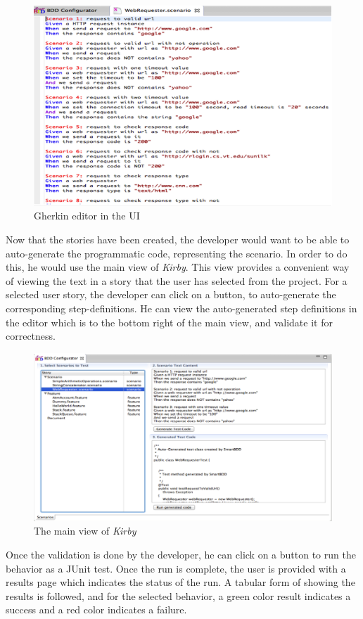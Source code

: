 \documentclass[conference, onecolumn, a4, 12pt]{IEEEtran}
\begin{document}
\begin{figure}
	\centering
	\includegraphics[width=0.7\linewidth]{Gherkin_editor}
	\caption{Gherkin editor in the UI}
	\label{fig:gherkineditor}
\end{figure}

Now that the stories have been created, the developer would want to be able to auto-generate the programmatic code, representing the scenario. In order to do this, he would use the main view of \textit{Kirby}. This view provides a convenient way of viewing the text in a story that the user has selected from the project. For a selected user story, the developer can click on a button, to auto-generate the corresponding step-definitions. He can view the auto-generated step definitions in the editor which is to the bottom right of the
main view, and validate it for correctness. 

\begin{figure}
	\centering
	\includegraphics[width=0.7\linewidth]{Main_view_of_kirby}
	\caption{The main view of \textit{Kirby}}
	\label{fig:mainviewofkirby}
\end{figure}

Once the validation is done by the developer, he can click on a button to run the behavior as a JUnit test. Once the run is complete, the user is provided with a results page which indicates the status of the run. A tabular form of showing the results is followed, and for the selected behavior, a green color result indicates a success and a red color indicates a failure.
\end{document}
